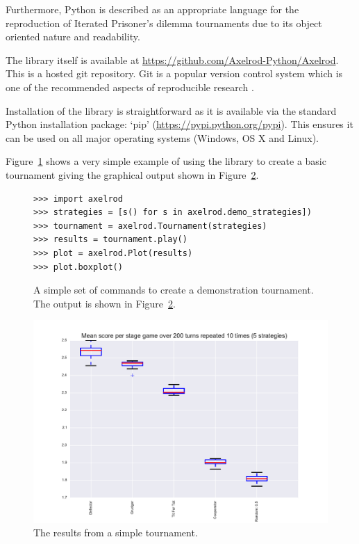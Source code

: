 \documentclass{article}
\begin{document}
Furthermore, \cite{Isaac2008} Python is described as an appropriate language for the
reproduction of Iterated Prisoner's dilemma tournaments due to its object
oriented nature and readability.

The library itself is available at
\url{https://github.com/Axelrod-Python/Axelrod}. This is a hosted git
repository. Git is a popular version control system which is one of the
recommended aspects of reproducible research \cite{Crick2014a, Sandve2013}.

Installation of the library is straightforward as it is available via the
standard Python installation package: `pip'
(\url{https://pypi.python.org/pypi}). This ensures it can be used on all major
operating systems (Windows, OS X and Linux).

Figure~\ref{fig:demo_tournament_commands} shows a very simple example of using
the library to create a basic tournament giving the graphical output shown in
Figure~\ref{fig:demo_tournament}.

\begin{figure}[!hbtp]
    \begin{verbatim}
>>> import axelrod
>>> strategies = [s() for s in axelrod.demo_strategies])
>>> tournament = axelrod.Tournament(strategies)
>>> results = tournament.play()
>>> plot = axelrod.Plot(results)
>>> plot.boxplot()
    \end{verbatim}
    \caption{A simple set of commands to create a demonstration tournament. The
        output is shown in Figure~\ref{fig:demo_tournament}.}
    \label{fig:demo_tournament_commands}
\end{figure}

\begin{figure}[!hbtp]
    \centering
    \includegraphics[width=.8\textwidth]{../img/demo_tournament.pdf}
    \caption{The results from a simple tournament.}
    \label{fig:demo_tournament}
\end{figure}
\end{document}

